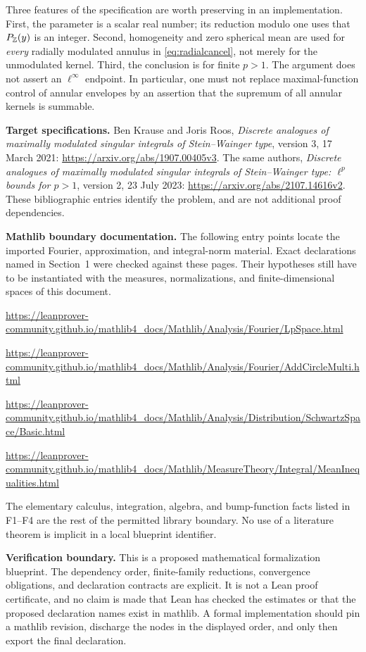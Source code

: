 \documentclass[11pt,oneside]{article}
\theoremstyle{definition}\newtheorem{definition}[theorem]{Definition}
\theoremstyle{remark}\newtheorem{remark}[theorem]{Remark}
\begin{document}
Three features of the specification are worth preserving in an implementation.
First, the parameter is a scalar real number; its reduction modulo one uses
that $P_\mathbb Z(y)$ is an integer. Second, homogeneity and zero spherical mean
are used for \emph{every} radially modulated annulus in
\eqref{eq:radialcancel}, not merely for the unmodulated kernel. Third, the
conclusion is for finite $p>1$. The argument does not assert an $\ell^\infty$
endpoint. In particular, one must not replace maximal-function control of
annular envelopes by an assertion that the supremum of all annular kernels
is summable.

\textbf{Target specifications.}
Ben Krause and Joris Roos,
\emph{Discrete analogues of maximally modulated singular integrals of
Stein--Wainger type}, version 3, 17 March 2021:
\url{https://arxiv.org/abs/1907.00405v3}.
The same authors,
\emph{Discrete analogues of maximally modulated singular integrals of
Stein--Wainger type: $\ell^p$ bounds for $p>1$}, version 2, 23 July 2023:
\url{https://arxiv.org/abs/2107.14616v2}.
These bibliographic entries identify the problem, and are not additional
proof dependencies.

\textbf{Mathlib boundary documentation.}
The following entry points locate the imported Fourier, approximation, and
integral-norm material. Exact declarations named in Section~1 were checked
against these pages. Their hypotheses still have to be instantiated with
the measures, normalizations, and finite-dimensional spaces of this document.
\begin{flushleft}\small
\url{https://leanprover-community.github.io/mathlib4_docs/Mathlib/Analysis/Fourier/LpSpace.html}\par
\url{https://leanprover-community.github.io/mathlib4_docs/Mathlib/Analysis/Fourier/AddCircleMulti.html}\par
\url{https://leanprover-community.github.io/mathlib4_docs/Mathlib/Analysis/Distribution/SchwartzSpace/Basic.html}\par
\url{https://leanprover-community.github.io/mathlib4_docs/Mathlib/MeasureTheory/Integral/MeanInequalities.html}
\end{flushleft}
The elementary calculus, integration, algebra, and bump-function facts listed
in F1--F4 are the rest of the permitted library boundary. No use of a
literature theorem is implicit in a local blueprint identifier.

\textbf{Verification boundary.}
This is a proposed mathematical formalization blueprint. The dependency order,
finite-family reductions, convergence obligations, and declaration contracts
are explicit. It is not a Lean proof certificate, and no claim is made that
Lean has checked the estimates or that the proposed declaration names exist
in mathlib. A formal implementation should pin a mathlib revision, discharge
the nodes in the displayed order, and only then export the final declaration.
\end{document}
